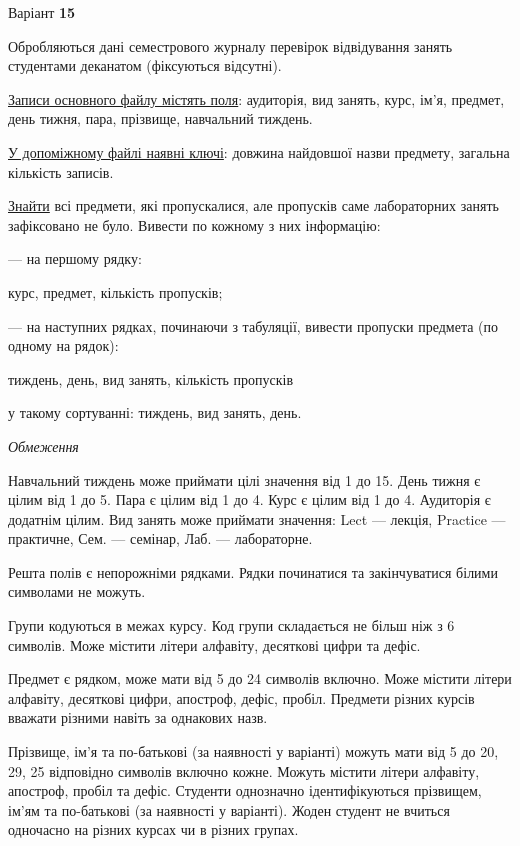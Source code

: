 \documentclass[11pt, ukrainian]{article}
\begin{document}
\par
\newpage
{\center Варіант  \No \textbf { 15 }\par}
\bigskip
Обробляються дані семестрового журналу перевірок відвідування занять студентами деканатом (фіксуються відсутні). 

\underline{Записи основного файлу містять поля}: аудиторія, вид занять, курс, ім’я, предмет, день тижня, пара, прізвище, навчальний тиждень.

\underline{У допоміжному файлі наявні ключі}: довжина найдовшої назви предмету, загальна кількість записів.

\underline{Знайти} всі предмети, які пропускалися, але пропусків саме лабораторних занять зафіксовано не було. Вивести по кожному з них інформацію:\par
{\noindent}--- на першому рядку:\par
курс, предмет, кількість пропусків;

{\noindent}--- на наступних рядках, починаючи з табуляції, вивести пропуски предмета (по одному на рядок):\par
тиждень, день, вид занять, кількість пропусків

{\noindent}у такому сортуванні: тиждень, вид занять, день.


\bigskip\textit{Обмеження}

Навчальний тиждень може приймати цілі значення від 1 до 15.
День тижня є цілим від 1 до 5. Пара є цілим від 1 до 4.
Курс є цілим від 1 до 4. Аудиторія є додатнім цілим.
Вид занять може приймати значення:
Lect --- лекція, Practice --- практичне, Сем. --- семінар, Лаб. --- лабораторне.

Решта полів є непорожніми рядками.
Рядки починатися та закінчуватися білими символами не можуть.

Групи кодуються в межах курсу.
Код групи складається не більш ніж з 6 символів.
Може містити літери алфавіту, десяткові цифри та дефіс.

Предмет є рядком, може мати від 5 до 24 символів включно.
Може містити літери алфавіту, десяткові цифри, апостроф, дефіс, пробіл.
Предмети різних курсів вважати різними навіть за однакових назв.

Прізвище, ім’я та по-батькові (за наявності у варіанті)
можуть мати від 5 до 20, 29, 25 відповідно символів включно кожне.
Можуть містити літери алфавіту, апостроф, пробіл та дефіс.
Студенти однозначно ідентифікуються прізвищем, ім’ям та по-батькові (за наявності у варіанті).
Жоден студент не вчиться одночасно на різних курсах чи в різних групах.
\end{document}
